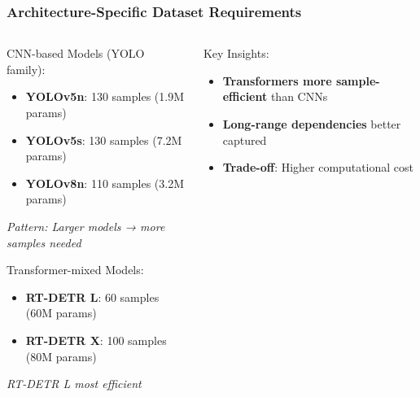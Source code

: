 \documentclass[aspectratio=43]{beamer}
\begin{document}
\begin{frame}
    \frametitle{Architecture-Specific Dataset Requirements}
    
    \begin{columns}
        \begin{column}{0.6\textwidth}
            \begin{block}{CNN-based Models (YOLO family):}
                \small
                \begin{itemize}
                    \item \textbf{YOLOv5n}: 130 samples (1.9M params)
                    \item \textbf{YOLOv5s}: 130 samples (7.2M params)
                    \item \textbf{YOLOv8n}: 110 samples (3.2M params)
                \end{itemize}
                
                \textit{Pattern: Larger models → more samples needed}
            \end{block}
            
            \begin{exampleblock}{Transformer-mixed Models:}
                \small
                \begin{itemize}
                    \item \textbf{RT-DETR L}: 60 samples (60M params)
                    \item \textbf{RT-DETR X}: 100 samples (80M params)
                \end{itemize}
                
                \textit{RT-DETR L most efficient}
            \end{exampleblock}
        \end{column}
        
        \begin{column}{0.4\textwidth}
            \begin{block}{Key Insights:}
                \small
                \begin{itemize}
                    \item \textbf{Transformers more sample-efficient} than CNNs
                    \item \textbf{Long-range dependencies} better captured
                    \item \textbf{Trade-off}: Higher computational cost
                \end{itemize}
            \end{block}
            

\end{column}
\end{columns}
\end{frame}
\end{document}
